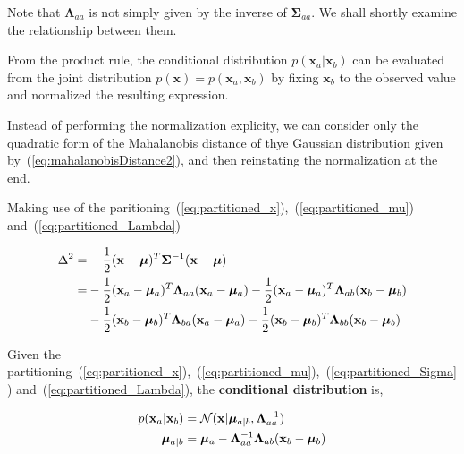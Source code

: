 Note that $\bm{\Lambda}_{aa}$ is not simply given by the inverse of $\bm{\Sigma}_{aa}$.
We shall shortly examine the relationship between them.

\vspace{0.3cm}

From the product rule, the conditional distribution $p(\mathbf{x}_a|\mathbf{x}_b)$ can be evaluated from the joint distribution $p(\mathbf{x}) = p(\mathbf{x}_a,\mathbf{x}_b)$ by fixing $\mathbf{x}_b$ to the observed value and normalized the resulting expression.

Instead of performing the normalization explicity, we can consider only the quadratic form of the Mahalanobis distance of thye Gaussian distribution given by~(\ref{eq:mahalanobisDistance2}), and then reinstating the normalization at the end. 

Making use of the paritioning~(\ref{eq:partitioned_x}),~(\ref{eq:partitioned_mu}) and~(\ref{eq:partitioned_Lambda})

\begin{equation}\label{eq:partitioned_mahalanobisDistance2}
\begin{split}
 \Delta^2  = & -\frac{1}{2} (\mathbf{x}-\bm{\mu})^T \bm{\Sigma}^{-1} (\mathbf{x}-\bm{\mu}) \\
  = &  -\frac{1}{2} (\mathbf{x}_a-\bm{\mu}_a)^T \bm{\Lambda}_{aa} (\mathbf{x}_a-\bm{\mu}_a) -\frac{1}{2} (\mathbf{x}_a-\bm{\mu}_a)^T \bm{\Lambda}_{ab} (\mathbf{x}_b-\bm{\mu}_b) \\
 & -\frac{1}{2} (\mathbf{x}_b-\bm{\mu}_b)^T \bm{\Lambda}_{ba} (\mathbf{x}_a-\bm{\mu}_a) -\frac{1}{2} (\mathbf{x}_b-\bm{\mu}_b)^T \bm{\Lambda}_{bb} (\mathbf{x}_b-\bm{\mu}_b)  
\end{split}
\end{equation}


\begin{framed}

 Given the partitioning~(\ref{eq:partitioned_x}),~(\ref{eq:partitioned_mu}),~(\ref{eq:partitioned_Sigma}) and~(\ref{eq:partitioned_Lambda}), the \textbf{conditional distribution} is, 

 \begin{equation}
 \begin{split}
 p(\mathbf{x}_a|\mathbf{x}_b) & = \mathcal{N}(\mathbf{x}| \bm{\mu}_{a|b}, \bm{\Lambda}_{aa}^{-1}) \\
 \bm{\mu}_{a|b} & = \bm{\mu}_a - \bm{\Lambda}_{aa}^{-1}\bm{\Lambda}_{ab} (\mathbf{x}_b-\bm{\mu}_b)
 \end{split}
 \end{equation}

 
 
\end{framed}





